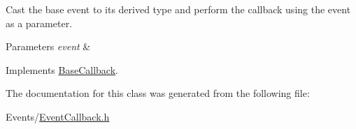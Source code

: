 Cast the base event to its derived type and perform the callback using the event as a parameter. 


\begin{DoxyParams}{Parameters}
{\em event} & \\
\hline
\end{DoxyParams}


Implements \hyperlink{classBaseCallback_af87d16a88aaf3c429e5f020798f97a8b}{Base\+Callback}.



The documentation for this class was generated from the following file\+:\begin{DoxyCompactItemize}
\item 
Events/\hyperlink{EventCallback_8h}{Event\+Callback.\+h}\end{DoxyCompactItemize}
